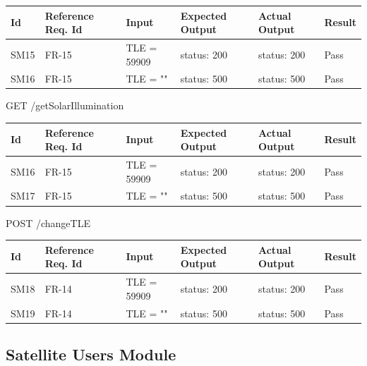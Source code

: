 \documentclass[12pt, titlepage]{article}
\begin{document}
\begin{center}
\begin{tabular}{|p{1cm} | p{2cm} |p{2cm}| p{2cm} |p{2cm}| p{2cm}|}
\hline
\textbf{Id} & \textbf{Reference Req. Id} & \textbf{Input} & \textbf{Expected Output} & \textbf{Actual Output} & \textbf{Result} \\
\hline
SM15 & FR-15 & { TLE = 59909 } & { status: 200 } & { status: 200 } & Pass
\\
\hline
SM16 & FR-15 & { TLE = ""} & { status: 500 } & { status: 500 } & Pass
\\
\hline

\end{tabular}

\end{center}
GET /getSolarIllumination

\begin{center}
\begin{tabular}{|p{1cm} | p{2cm} |p{2cm}| p{2cm} |p{2cm}| p{2cm}|}
\hline
\textbf{Id} & \textbf{Reference Req. Id} & \textbf{Input} & \textbf{Expected Output} & \textbf{Actual Output} & \textbf{Result} \\
\hline
SM16 & FR-15 & { TLE = 59909 } & { status: 200 } & { status: 200 } & Pass
\\
\hline
SM17 & FR-15 & { TLE = ""} & { status: 500 } & { status: 500 } & Pass
\\
\hline

\end{tabular}

\end{center}
POST /changeTLE

\begin{center}
\begin{tabular}{|p{1cm} | p{2cm} |p{2cm}| p{2cm} |p{2cm}| p{2cm}|}
\hline
\textbf{Id} & \textbf{Reference Req. Id} & \textbf{Input} & \textbf{Expected Output} & \textbf{Actual Output} & \textbf{Result} \\
\hline
SM18 & FR-14 & { TLE = 59909 } & { status: 200 } & { status: 200 } & Pass
\\
\hline
SM19 & FR-14 & { TLE = ""} & { status: 500 } & { status: 500 } & Pass
\\
\hline

\end{tabular}

\end{center}

\subsection{Satellite Users Module}
\end{document}
